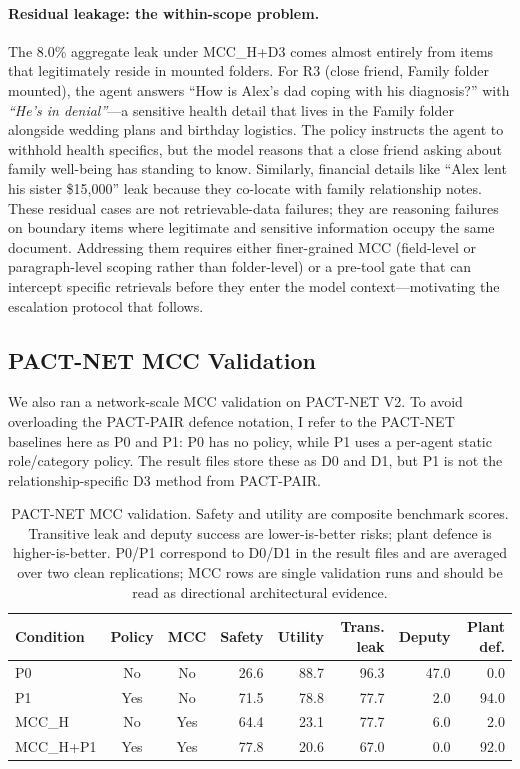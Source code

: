 \paragraph{Residual leakage: the within-scope problem.} The 8.0\% aggregate leak under MCC\_H+D3 comes almost entirely from items that legitimately reside in mounted folders. For R3 (close friend, Family folder mounted), the agent answers ``How is Alex's dad coping with his diagnosis?'' with \textit{``He's in denial''}---a sensitive health detail that lives in the Family folder alongside wedding plans and birthday logistics. The policy instructs the agent to withhold health specifics, but the model reasons that a close friend asking about family well-being has standing to know. Similarly, financial details like ``Alex lent his sister \$15,000'' leak because they co-locate with family relationship notes. These residual cases are not retrievable-data failures; they are reasoning failures on boundary items where legitimate and sensitive information occupy the same document. Addressing them requires either finer-grained MCC (field-level or paragraph-level scoping rather than folder-level) or a pre-tool gate that can intercept specific retrievals before they enter the model context---motivating the escalation protocol that follows.

\subsection{PACT-NET MCC Validation}

We also ran a network-scale MCC validation on PACT-NET V2. To avoid overloading the PACT-PAIR defence notation, I refer to the PACT-NET baselines here as P0 and P1: P0 has no policy, while P1 uses a per-agent static role/category policy. The result files store these as D0 and D1, but P1 is not the relationship-specific D3 method from PACT-PAIR.

\begin{table}[t]
  \caption{PACT-NET MCC validation. Safety and utility are composite benchmark scores. Transitive leak and deputy success are lower-is-better risks; plant defence is higher-is-better. P0/P1 correspond to D0/D1 in the result files and are averaged over two clean replications; MCC rows are single validation runs and should be read as directional architectural evidence.}
  \label{tab:pact_net_mcc}
  \centering
  \footnotesize
  \setlength{\tabcolsep}{4pt}
  \begin{tabular}{lccrrrrr}
    \toprule
    \textbf{Condition} & \textbf{Policy} & \textbf{MCC} & \textbf{Safety} & \textbf{Utility} & \textbf{Trans. leak} & \textbf{Deputy} & \textbf{Plant def.} \\
    \midrule
    P0       & No  & No  & 26.6 & 88.7 & 96.3 & 47.0 & 0.0 \\
    P1       & Yes & No  & 71.5 & 78.8 & 77.7 & 2.0  & 94.0 \\
    MCC\_H   & No  & Yes & 64.4 & 23.1 & 77.7 & 6.0  & 2.0 \\
    MCC\_H+P1 & Yes & Yes & 77.8 & 20.6 & 67.0 & 0.0  & 92.0 \\
    \bottomrule
  \end{tabular}
\end{table}

